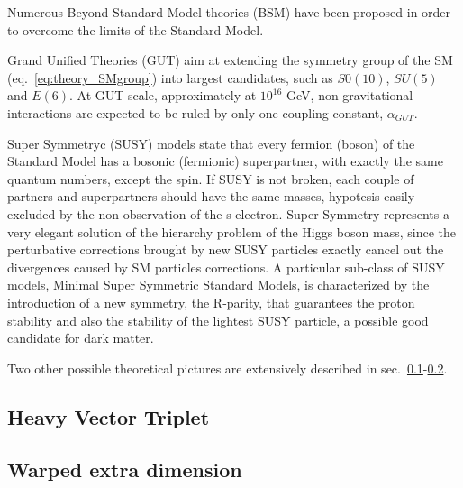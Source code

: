 Numerous Beyond Standard Model theories (BSM) have been proposed in order to overcome the limits of the Standard Model.

Grand Unified Theories (GUT) aim at extending the symmetry group of the SM (eq.~\ref{eq:theory_SMgroup}) into largest candidates, such as $S0(10)$, $SU(5)$ and $E(6)$. At GUT scale, approximately at $10^{16}$ GeV, non-gravitational interactions are expected to be ruled by only one coupling constant, $\alpha_{GUT}$. %

Super Symmetryc (SUSY) models state that every fermion (boson) of the Standard Model has a bosonic (fermionic) superpartner, with exactly the same quantum numbers, except the spin. If SUSY is not broken, each couple of partners and superpartners should have the same masses, hypotesis easily excluded by the non-observation of the s-electron. Super Symmetry represents a very elegant solution of the hierarchy problem of the Higgs boson mass, since the perturbative corrections brought by new SUSY particles exactly cancel out the divergences caused by SM particles corrections. A particular sub-class of SUSY models, Minimal Super Symmetric Standard Models, is characterized by the introduction of a new symmetry, the R-parity, that guarantees the proton stability and also the stability of the lightest SUSY particle, a possible good candidate for dark matter.

Two other possible theoretical pictures are extensively described in sec.~\ref{sec:theory_HVT}-\ref{sec:theory_WED}.


\subsection{Heavy Vector Triplet}
\label{sec:theory_HVT}

\subsection{Warped extra dimension}
\label{sec:theory_WED}


\clearpage


